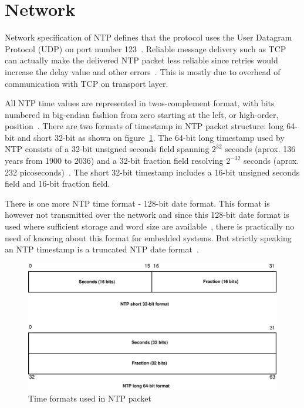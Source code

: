 
\section{Network}\label{sec:ntp-network}
Network specification of NTP defines that
the protocol uses the User Datagram Protocol (UDP) on port number 123~\cite{ianna-ports,rfc5905}.
Reliable message delivery such as TCP can actually make the delivered NTP packet less reliable since retries
would increase the delay value and other errors~\cite{rfc5905}.
This is mostly due to overhead of communication with TCP on transport layer.

All NTP time values are represented in twos-complement format, with
bits numbered in big-endian fashion from zero starting at the left, or high-order, position~\cite{rfc5905}. 
There are two formats of timestamp in NTP packet structure:
long 64-bit and short 32-bit as shown on figure~\ref{fig:ntp-timestamps}.
The 64-bit long timestamp used by NTP consists of a 32-bit unsigned seconds
field spanning $2^{32}$ seconds (aprox. 136 years from 1900 to 2036) and a 32-bit fraction field resolving
$2^{-32}$ seconds (aprox. 232 picoseconds)~\cite{rfc5905}.
The short 32-bit timestamp includes a 16-bit unsigned seconds field
and 16-bit fraction field.

There is one more NTP time format - 128-bit date format.
This format is however not transmitted over the network
and since this 128-bit date format is used where sufficient storage and word
size are available~\cite{rfc5905},
there is practically no need of knowing about this format for embedded systems.
But strictly speaking an NTP timestamp is a truncated NTP date format~\cite{rfc5905}.

\begin{figure}
	\centering
	\includegraphics[width=13cm,keepaspectratio]{fig/ntp-timestamps.pdf}
	\caption{Time formats used in NTP packet}
	\label{fig:ntp-timestamps}
	\bigskip
\end{figure}


